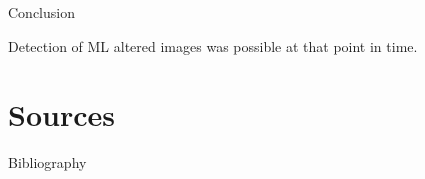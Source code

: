 \documentclass[xcolor=table]{beamer}
\begin{document}
\begin{frame}[containsverbatim]{Conclusion}
\begin{block}{}
 Detection of ML altered images was possible at that point in time. 
\end{block}
\end{frame}

\section{Sources}

\begin{frame}[allowframebreaks]{Bibliography}

\begin{thebibliography}{99}

 
\end{thebibliography}

\end{frame}
\end{document}
